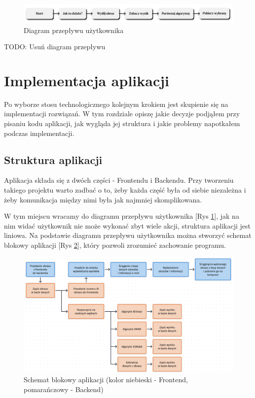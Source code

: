 \begin{figure}[ht]
    \centering
    \includegraphics[width=\linewidth]{Rozdziały/06.Aplikacja/Obrazy/user-flow.png}  
    \caption{Diagram przepływu użytkownika}
    \label{fig:image82}
\end{figure}

TODO: Usuń diagram przepływu

\section{Implementacja aplikacji}

Po wyborze stosu technologicznego kolejnym krokiem jest skupienie się na implementacji rozwiązań. W tym rozdziale opiszę jakie decyzje podjąłem przy pisaniu kodu aplikacji, jak wygląda jej struktura i jakie problemy napotkałem podczas implementacji.

\subsection*{Struktura aplikacji}

Aplikacja składa się z dwóch części - Frontendu i Backendu. Przy tworzeniu takiego projektu warto zadbać o to, żeby każda część była od siebie niezależna i żeby komunikacja między nimi była jak najmniej skomplikowana.

W tym miejscu wracamy do diagramu przepływu użytkownika [Rys \ref{fig:image82}], jak na nim widać użytkownik nie może wykonać zbyt wiele akcji, struktura aplikacji jest liniowa. Na podstawie diagramu przepływu użytkownika można stworzyć schemat blokowy aplikacji [Rys \ref{fig:image87}], który pozwoli zrozumieć zachowanie programu.

\begin{figure}[H]
    \centering
    \includegraphics[width=\linewidth]{Rozdziały/06.Aplikacja/Obrazy/mechanizm_aplikacji.png}  
    \caption{Schemat blokowy aplikacji (kolor niebieski - Frontend, pomarańczowy - Backend)}
    \label{fig:image87}
\end{figure}

